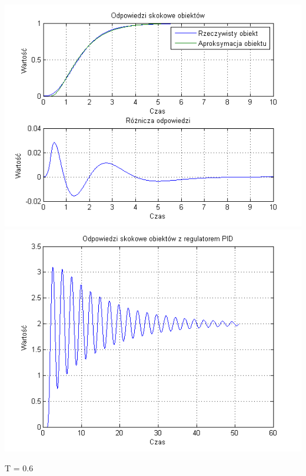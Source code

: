 \documentclass[10pt,a4paper]{article}
\begin{document}
\begin{center}
\includegraphics[scale=1]{images/dwa/skrypt_255.png}\\
\includegraphics[scale=1]{images/dwa/skrypt_256.png}\\
\end{center}
\newpage
T = 0.6
\end{document}
